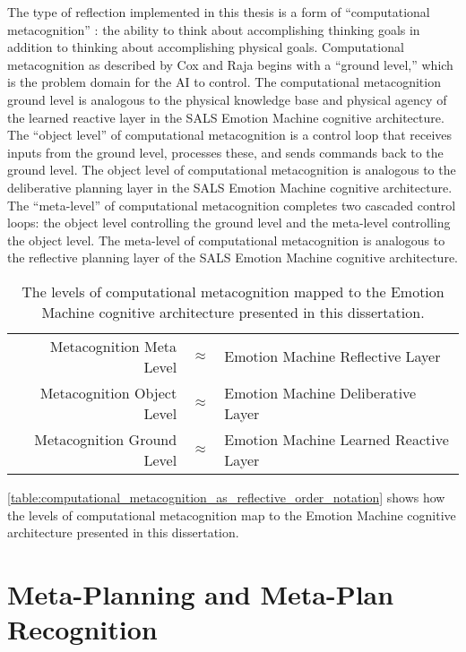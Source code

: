 The type of reflection implemented in this thesis is a form of
``computational metacognition'' \cite[]{cox_and_raja:2008,cox:2010}:
the ability to think about accomplishing thinking goals in addition to
thinking about accomplishing physical goals.  Computational
metacognition as described by Cox and Raja begins with a ``ground
level,'' which is the problem domain for the AI to control.  The
computational metacognition ground level is analogous to the physical
knowledge base and physical agency of the learned reactive layer in
the SALS Emotion Machine cognitive architecture.  The ``object level''
of computational metacognition is a control loop that receives inputs
from the ground level, processes these, and sends commands back to the
ground level.  The object level of computational metacognition is
analogous to the deliberative planning layer in the SALS Emotion
Machine cognitive architecture.  The ``meta-level'' of computational
metacognition completes two cascaded control loops: the object level
controlling the ground level and the meta-level controlling the object
level.  The meta-level of computational metacognition is analogous to
the reflective planning layer of the SALS Emotion Machine cognitive
architecture.
\begin{table}
\begin{tabular}{|rll|}
\hline
Metacognition Meta Level   &${\approx}$ &Emotion Machine Reflective Layer \\
Metacognition Object Level &${\approx}$ &Emotion Machine Deliberative Layer \\
Metacognition Ground Level &${\approx}$ &Emotion Machine Learned Reactive Layer \\
\hline
\end{tabular}
\caption{The levels of computational metacognition mapped to the
  Emotion Machine cognitive architecture presented in this
  dissertation.}
\label{table:computational_metacognition_as_reflective_order_notation}
\end{table}
\autoref{table:computational_metacognition_as_reflective_order_notation}
shows how the levels of computational metacognition map to the Emotion
Machine cognitive architecture presented in this dissertation.

\section{Meta-Planning and Meta-Plan Recognition}
\label{section:meta_planning_and_meta_plan_recognition}

